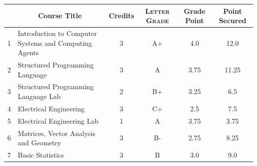 \documentclass[11pt]{article}
\newcommand*{\numtwo}[1]{\pgfmathprintnumber[
                    fixed, precision=2, fixed zerofill=true]{#1}}
\begin{document}
                \begin{center}
                    \renewcommand{\arraystretch}{1.08}
                    
                \begin{tabular}{|c|l|c|>{\scshape}c|c|c|}
                \hline  \rule[-1ex]{0pt}{3.5ex} {\centering{\bf Course Code}} &  \multicolumn{1}{c|}{\textbf{Course Title}}  & {\bf Credits} & {\bf Letter Grade} & {\bf Grade Point} & {\bf Point Secured}  \\ 
                \hline   1 &  Introduction to Computer Systems and Computing Agents		 & 3 & A+ & 4.0 & 12.0 \\ %
                \hline   2 &  Structured Programming Language		 & 3 & A & 3.75 & 11.25 \\ %
                \hline   3 &  Structured Programming Language Lab		 & 2 & B+ & 3.25 & 6.5 \\ %
                \hline   4 &  Electrical Engineering		 & 3 & C+ & 2.5 & 7.5 \\ %
                \hline   5 &  Electrical Engineering Lab		 & 1 & A & 3.75 & 3.75 \\ %
                \hline   6 &  Matrices, Vector Analysis and Geometry		 & 3 & B- & 2.75 & 8.25 \\ %
                \hline   7 &  Basic Statistics		 & 3 & B & 3.0 & 9.0 \\ %

\hline                %
                \end{tabular}
                \end{center}
                \renewcommand{\arraystretch}{1.03}
\end{document}
